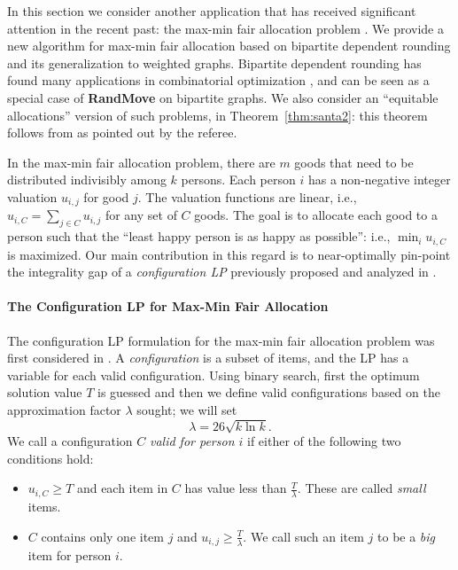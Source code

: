 In this section we consider another application that has received significant attention in the recent past: the max-min fair allocation problem
\cite{dani:05,julia:focs09,asadpour:stoc07,asadpour-feige-saberi,bansal:stoc06}. We provide a new algorithm for max-min fair allocation based on bipartite dependent rounding \cite{gkps:dep-round} and its generalization to weighted graphs. Bipartite dependent rounding has found many applications in combinatorial optimization \cite{srin:level-sets,gkps:dep-round,kmps:unified-sched}, and can be seen as a special case of {\bf RandMove} on bipartite graphs. We also consider an ``equitable allocations'' version of
such problems, in Theorem~\ref{thm:santa2}: this theorem follows from \cite{shmoys-tardos:gap} as pointed out by the referee. 

In the max-min fair allocation problem,
there are $m$ goods that need to be distributed indivisibly among $k$ persons. Each person $i$ has a non-negative integer valuation $u_{i,j}$ for good $j$. The valuation functions are linear, i.e., $u_{i,C}=\sum_{j \in C} u_{i,j}$ for any set of $C$ goods. The goal is to allocate each good to a person such that the ``least happy person is as happy as possible'': i.e., $\min_{i} u_{i,C}$ is maximized. Our main contribution  in this regard
is to near-optimally pin-point the integrality gap of a {\em configuration LP} previously proposed and analyzed in \cite{bansal:stoc06,asadpour:stoc07}.


\noindent
\paragraph{\textbf{The Configuration LP for Max-Min Fair Allocation}}

The configuration LP formulation for the max-min fair allocation problem was first considered in
\cite{bansal:stoc06}. A {\it configuration} is a subset of items,
and the LP has a
variable for each valid configuration. Using binary search, first the optimum solution value $T$ is guessed and then
we define valid configurations based on the approximation factor $\lambda$ sought; we will set
\begin{equation}
\label{eqn:lambda}
\lambda = 26 \sqrt{k \ln k}.
\end{equation}
We call a configuration $C$  {\it valid for person $i$} if either of the following two conditions hold:
\begin{itemize}
\item  $u_{i,C} \geq T$ and each item  in $C$ has value less than $\frac{T}{\lambda} $. These are called {\em small} items.
\item $C$ contains only one item $j$ and $u_{i,j} \geq \frac{T}{\lambda}$. We call such an item $j$ to be a {\em big} item for person $i$.
\end{itemize}

